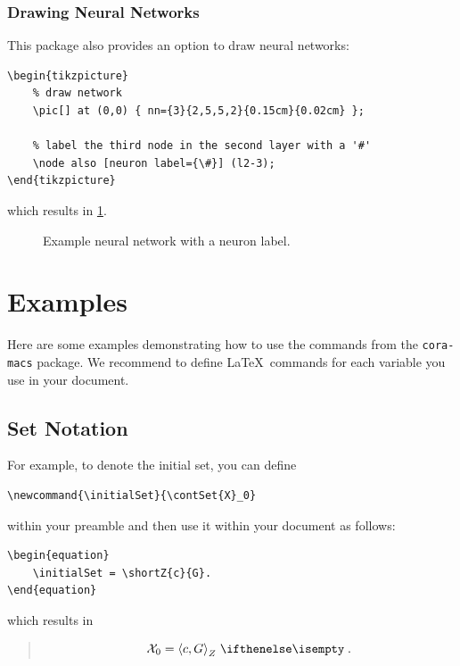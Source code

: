 \documentclass{article}
\begin{document}
\subsubsection{Drawing Neural Networks}

This package also provides an option to draw neural networks:
\begin{verbatim}
\begin{tikzpicture}
    % draw network
    \pic[] at (0,0) { nn={3}{2,5,5,2}{0.15cm}{0.02cm} };

    % label the third node in the second layer with a '#'
    \node also [neuron label={\#}] (l2-3);
\end{tikzpicture}
\end{verbatim}
which results in \cref{fig:neural-network}.

\begin{figure}[h!]
  \centering
  \caption{Example neural network with a neuron label.}
  \label{fig:neural-network}
\end{figure}

\section{Examples}
Here are some examples demonstrating how to use the commands from the \texttt{cora-macs} package.
We recommend to define \LaTeX\ commands for each variable you use in your document.

\subsection{Set Notation}
For example, to denote the initial set, you can define
\newcommand{\initialSet}{\contSet{X}_0}
\begin{verbatim}
\newcommand{\initialSet}{\contSet{X}_0}
\end{verbatim}
within your preamble and then use it within your document as follows:
\begin{verbatim}
\begin{equation}
    \initialSet = \shortZ{c}{G}.
\end{equation}
\end{verbatim}
which results in
\begin{quote}
  \begin{equation}
    \initialSet = \shortZ{c}{G}.
  \end{equation}
\end{quote}
\end{document}
